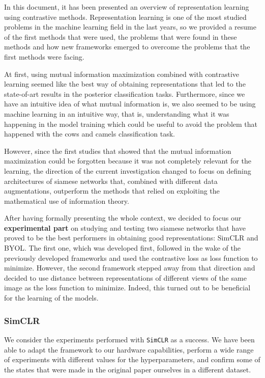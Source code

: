In this document, it has been presented an overview of representation learning using contrastive methods. Representation learning is one of the most studied problems in the machine learning field in the last years, so we provided a resume of the first methods that were used, the problems that were found in these methods and how new frameworks emerged to overcome the problems that the first methods were facing.

At first, using mutual information maximization combined with contrastive learning seemed like the best way of obtaining representations that led to the state-of-art results in the posterior classification tasks. Furthermore, since we have an intuitive idea of what mutual information is, we also seemed to be using machine learning in an intuitive way, that is, understanding what it was happening in the model training which could be useful to avoid the problem that happened with the cows and camels classification task.

However, since the first studies that showed that the mutual information maximization could be forgotten because it was not completely relevant for the learning, the direction of the current investigation changed to focus on defining architectures of siamese networks that, combined with different data augmentations, outperform the methods that relied on exploiting the mathematical use of information theory.

After having formally presenting the whole  context, we decided to focus our \textbf{experimental part} on studying and testing two siamese networks that have proved to be the best performers in obtaining good representations: SimCLR and BYOL. The first one, which was developed first, followed in the wake of the previously developed frameworks and used the contrastive loss as loss function to minimize. However, the second framework stepped away from that direction and decided to use distance between representations of different views of the same image as the loss function to minimize. Indeed, this turned out to be beneficial for the learning of the models. 

\subsubsection*{SimCLR}

We consider the experiments performed with \lstinline{SimCLR} as a success. We have been able to adapt the framework to our hardware capabilities, perform a wide range of experiments with different values for the hyperparameters, and confirm some of the states that were made in the original paper ourselves in a different dataset.

